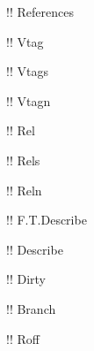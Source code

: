 \documentclass[10pt,a4paper]{article}
\begin{document}
\ttfamily
!\gitReferences ! References

!\gitVtag ! Vtag

!\gitVtags ! Vtags

!\gitVtagn ! Vtagn

!\gitRel ! Rel

!\gitRels ! Rels

!\gitReln ! Reln

!\gitFirstTagDescribe ! F.T.Describe

!\gitDescribe ! Describe

!\gitDirty ! Dirty

!\gitBranch ! Branch

!\gitRoff ! Roff
\end{document}
